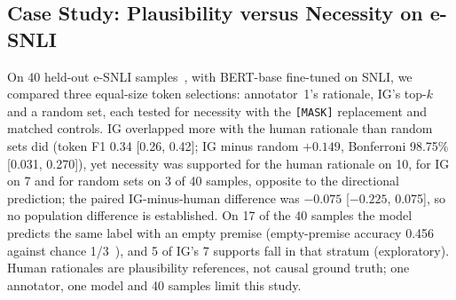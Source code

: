 \subsection{Case Study: Plausibility versus Necessity on e-SNLI}

On 40 held-out e-SNLI samples~\cite{camburu2018esnli,bowman2015snli}, with BERT-base fine-tuned on SNLI, we compared three equal-size token selections: annotator~1's rationale, IG's top-$k$ and a random set, each tested for necessity with the \texttt{[MASK]} replacement and matched controls. IG overlapped more with the human rationale than random sets did (token F1 0.34 [0.26, 0.42]; IG minus random $+0.149$, Bonferroni 98.75\% [0.031, 0.270]), yet necessity was supported for the human rationale on 10, for IG on 7 and for random sets on 3 of 40 samples, opposite to the directional prediction; the paired IG-minus-human difference was $-0.075$ [$-0.225$, 0.075], so no population difference is established. On 17 of the 40 samples the model predicts the same label with an empty premise (empty-premise accuracy 0.456 against chance 1/3~\cite{gururangan2018artifacts}), and 5 of IG's 7 supports fall in that stratum (exploratory). Human rationales are plausibility references, not causal ground truth; one annotator, one model and 40 samples limit this study.

